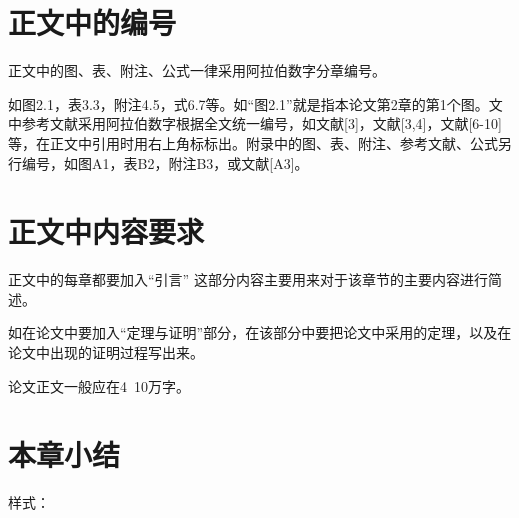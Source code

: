 \section{正文中的编号}
%
\label{sec:the_number_of_main_body}
正文中的图、表、附注、公式一律采用阿拉伯数字分章编号。

如图2.1，表3.3，附注4.5，式6.7等。如“图2.1”就是指本论文第2章的第1个图。文中参考文献采用阿拉伯数字根据全文统一编号，如文献[3]，文献[3,4]，文献[6-10]等，在正文中引用时用右上角标标出。附录中的图、表、附注、参考文献、公式另行编号，如图A1，表B2，附注B3，或文献[A3]。

\section{正文中内容要求}

正文中的每章都要加入“引言”  这部分内容主要用来对于该章节的主要内容进行简述。

如在论文中要加入“定理与证明”部分，在该部分中要把论文中采用的定理，以及在论文中出现的证明过程写出来。

论文正文一般应在4~10万字。


\section{本章小结}
\Large 样式：
\vspace{10pt}

